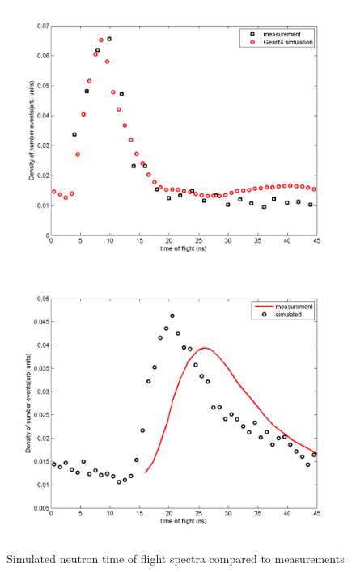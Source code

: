 \documentclass[11pt,a4paper]{IEEEtran}
\let\MYoriglatexcaption\caption
\renewcommand{\caption}[2][\relax]{\MYoriglatexcaption[#2]{#2}}
\begin{document}
\begin{figure}[t]
    \begin{minipage}{\columnwidth}
        \includegraphics[width=\columnwidth]{CUPTOFtofspectraRADECS.png}
    	\label{fig:TOFFrameOverlapspectrum}
    \end{minipage}
    \begin{minipage}{\columnwidth}
        \includegraphics[width=\columnwidth]{SUPtofspectraRADECS.png}
        \label{fig:SUP10FrameOverlapspectrum}
    \end{minipage}
    \caption{Simulated neutron time of flight spectra compared to measurements}
    \label{fig:TOFSpectra}
\end{figure}
\end{document}
